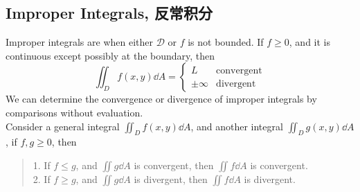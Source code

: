 \subsection{Improper Integrals, 反常积分}
Improper integrals are when either $\mathscr{D}$ or $f$ is not bounded. If $f \ge 0$, and it is continuous except possibly at the boundary, then 
$$\iint_D f(x, y) \dd A = \begin{cases}
    L & \text{convergent} \\
    \pm \infty & \text{divergent}
\end{cases}$$
We can determine the convergence or divergence of improper integrals by comparisons without evaluation. \\
Consider a general integral $\iint_D f(x, y) \dd A$, and another integral $\iint_D g(x, y) \dd A$, if $f, g \ge 0$, then
\begin{quote}
    1. If $f \le g$, and $\iint g \dd A$ is convergent, then $\iint f \dd A$ is convergent. \\
    2. If $f \ge g$, and $\iint g \dd A$ is divergent, then $\iint f \dd A$ is divergent.
\end{quote}

